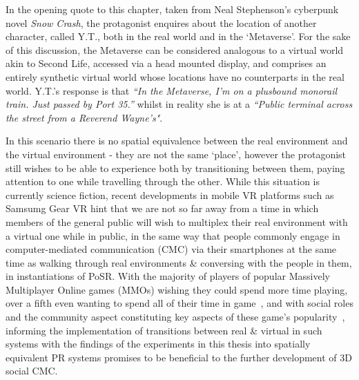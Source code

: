 In the opening quote to this chapter, taken from Neal Stephenson's cyberpunk novel \textit{Snow Crash}, the protagonist enquires about the location of another character, called Y.T., both in the real world and in the `Metaverse'. For the sake of this discussion, the Metaverse can be considered analogous to a virtual world akin to Second Life, accessed via a head mounted display, and comprises an entirely synthetic virtual world whose locations have no counterparts in the real world. Y.T.'s response is that \textit{``In  the Metaverse, I'm on a plusbound monorail train. Just passed by Port 35.''} whilst in reality she is at a \textit{``Public terminal across the street from a Reverend Wayne's"}.

In this scenario there is no spatial equivalence between the real environment and the virtual environment - they are not the same `place', however the protagonist still wishes to be able to experience both by transitioning between them, paying attention to one while travelling through the other. While this situation is currently science fiction, recent developments in mobile VR platforms such as Samsumg Gear VR hint that we are not so far away from a time in which members of the general public will wish to multiplex their real environment with a virtual one while in public, in the same way that people commonly engage in computer-mediated communication (CMC) via their smartphones at the same time as walking through real environments \& conversing with the people in them, in instantiations of PoSR. With the majority of players of popular Massively Multiplayer Online games (MMOs) wishing they could spend more time playing, over a fifth even wanting to spend all of their time in game~\cite{Castronova2006}, and with social roles and the community aspect constituting key aspects of these game's popularity~\cite{Castronova2006, Bartle2004}, informing the implementation of transitions between real \& virtual in such systems with the findings of the experiments in this thesis into spatially equivalent PR systems promises to be beneficial to the further development of 3D social CMC.




